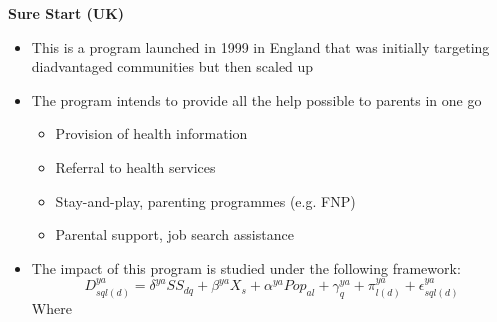\textbf{Sure Start (UK)}
\begin{itemize}
\item This is a program launched in  1999 in England that was initially targeting diadvantaged communities but then scaled up
\item The program intends to provide all the help possible to parents in one go
\begin{itemize}
    \item Provision of health information 
    \item Referral to health services
    \item Stay-and-play, parenting programmes (e.g. FNP)
    \item Parental support, job search assistance
\end{itemize}

\item The impact of this program is studied under the following framework:
$$D^{ya}_{sql(d)}=\delta^{ya}SS_{dq}+\beta^{ya}X_s+\alpha^{ya}Pop_{al}+\gamma^{ya}_q+\pi^{ya}_{l(d)}+\epsilon^{ya}_{sql(d)} $$
Where
\begin{itemize}


\end{itemize}
\end{itemize}

